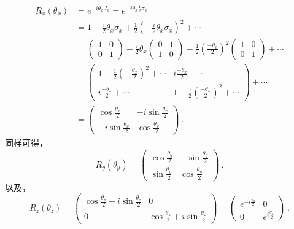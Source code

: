 \begin{equation}
\begin{aligned}
R_{x}\left(\theta_{x}\right) &=e^{-i \theta_{x} J_{x}}=e^{-i \theta_{x} \frac{1}{2} \sigma_{x}} \\
&=1-\frac{i}{2} \theta_{x} \sigma_{x}+\frac{1}{2}\left(-\frac{i}{2} \theta_{x} \sigma_{x}\right)^{2}+\cdots \\
&=\left(\begin{array}{cc}
1 & 0 \\
0 & 1
\end{array}\right)-\frac{i}{2} \theta_{x}\left(\begin{array}{cc}
0 & 1 \\
1 & 0
\end{array}\right)-\frac{1}{2}\left(\frac{-\theta_{x}}{2}\right)^{2}\left(\begin{array}{cc}
1 & 0 \\
0 & 1
\end{array}\right)+\cdots \\
&=\left(\begin{array}{cc}
1-\frac{1}{2}\left(-\frac{\theta_{x}}{2}\right)^{2}+\cdots & i \frac{-\theta_{x}}{2}+\cdots \\
i \frac{-\theta_{x}}{2}+\cdots & 1-\frac{1}{2}\left(\frac{-\theta_{x}}{2}\right)^{2}+\cdots
\end{array}\right)+\cdots \\
&=\left(\begin{array}{cc}
\cos \frac{\theta_{x}}{2} & -i \sin \frac{\theta_{x}}{2} \\
-i \sin \frac{\theta_{x}}{2} & \cos \frac{\theta_{x}}{2}
\end{array}\right)~.
\end{aligned}
\end{equation}
同样可得，
\begin{equation}
R_{y}\left(\theta_{y}\right)=\left(\begin{array}{cc}
\cos \frac{\theta_{y}}{2} & -\sin \frac{\theta_{y}}{2} \\
\sin \frac{\theta_{y}}{2} & \cos \frac{\theta_{y}}{2}
\end{array}\right)~.
\end{equation}
以及，
\begin{equation}
R_{z}\left(\theta_{z}\right)=\left(\begin{array}{cc}
\cos \frac{\theta_{z}}{2}-i \sin \frac{\theta_{z}}{2} & 0 \\
0 & \cos \frac{\theta_{z}}{2}+i \sin \frac{\theta_{z}}{2}
\end{array}\right)=\left(\begin{array}{cc}
e^{-i \frac{\theta_{z}}{2}} & 0 \\
0 & e^{i \frac{\theta_{z}}{2}}
\end{array}\right)~.
\end{equation}
